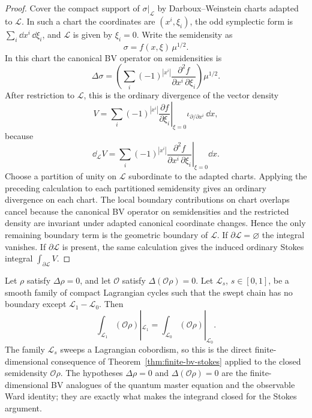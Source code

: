 \begin{proof}
Cover the compact support of \(\sigma|_{\mathcal L}\) by Darboux--Weinstein
charts adapted to \(\mathcal L\).  In such a chart the coordinates are
\((x^i,\xi_i)\), the odd symplectic form is
\(\sum_i\dd x^i\,\dd\xi_i\), and
\(\mathcal L\) is given by \(\xi_i=0\).  Write the semidensity as
\[
  \sigma=f(x,\xi)\,\mu^{1/2}.
\]
In this chart the canonical BV operator on semidensities is
\[
  \Delta\sigma
  =
  \left(
    \sum_i(-1)^{|x^i|}
    \frac{\partial^2 f}{\partial x^i\,\partial\xi_i}
  \right)\mu^{1/2}.
\]
After restriction to \(\mathcal L\), this is the ordinary divergence of the
vector density
\[
  V
  =
  \sum_i
  (-1)^{|x^i|}
  \left.
    \frac{\partial f}{\partial\xi_i}
  \right|_{\xi=0}
  \iota_{\partial/\partial x^i}\,\dd x ,
\]
because
\[
  \dd_{\mathcal L}V
  =
  \left.
  \sum_i(-1)^{|x^i|}
  \frac{\partial^2 f}{\partial x^i\,\partial\xi_i}
  \right|_{\xi=0}\dd x .
\]
Choose a partition of unity on \(\mathcal L\) subordinate to the adapted
charts.  Applying the preceding calculation to each partitioned semidensity
gives an ordinary divergence on each chart.  The local boundary
contributions on chart overlaps cancel because the canonical BV operator on
semidensities and the restricted density are invariant under adapted
canonical coordinate changes.  Hence the only remaining boundary term is the
geometric boundary of \(\mathcal L\).  If \(\partial\mathcal L=\varnothing\)
the integral vanishes.  If \(\partial\mathcal L\) is present, the same
calculation gives the induced ordinary Stokes integral
\(\int_{\partial\mathcal L}V\).
\end{proof}

\begin{remark}
\label{rem:bv-gauge-fixing-independence}
Let \(\rho\) satisfy \(\Delta\rho=0\), and let
\(\mathcal O\) satisfy \(\Delta(\mathcal O\rho)=0\).  Let
\(\mathcal L_s\), \(s\in[0,1]\), be a smooth family of compact Lagrangian
cycles such that the swept chain has no boundary except
\(\mathcal L_1-\mathcal L_0\).  Then
\[
  \int_{\mathcal L_1}(\mathcal O\rho)|_{\mathcal L_1}
  =
  \int_{\mathcal L_0}(\mathcal O\rho)|_{\mathcal L_0}.
\]
The family \(\mathcal L_s\) sweeps a Lagrangian cobordism, so this is the
direct finite-dimensional consequence of
Theorem~\ref{thm:finite-bv-stokes} applied to the closed semidensity
\(\mathcal O\rho\).  The hypotheses \(\Delta\rho=0\) and
\(\Delta(\mathcal O\rho)=0\) are the finite-dimensional BV analogues of the
quantum master equation and the observable Ward identity; they are exactly
what makes the integrand closed for the Stokes argument.
\end{remark}


